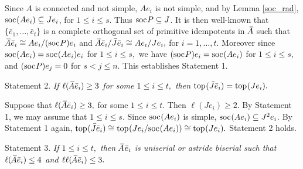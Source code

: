 \documentclass[10pt]{amsart}
\theoremstyle{definition}
\newcommand{\soc}{{\rm soc}\hspace{.5pt}}
\newcommand{\ntop}{{\rm top}\hspace{.5pt}}
\begin{document}
Since $A$ is connected and not simple, $Ae_i$ is not simple, and by Lemma \ref{soc_rad}, $\soc(Ae_i)\subseteq Je_i$, for $1\le i\le s$. Thus $\soc P\subseteq J$. It is then well-known that $\{\bar e_1, \ldots, \bar e_t\}$ is a complete orthogonal set of primitive idempotents in $\hspace{2pt}\overline{\hspace{-2.8pt}A}$ such that $\hspace{2pt}\overline{\hspace{-2.5pt}A} \bar e_i \cong Ae_i/(\soc P)e_i$ and $\hspace{2pt}\overline{\hspace{-2.5pt}A} \bar e_i / \bar J \bar e_i \cong Ae_i/Je_i,$ for $i=1, \ldots, t$. Moreover since $\soc(Ae_i) =\soc(Ae_i)e_i$ for $1\le i\le s,$ we have $(\soc P)e_i=\soc(Ae_i)$ for $1\le i\le s,$ and $(\soc P)e_j=0$ for $s<j\le n$. This establishes Statement 1.

\vspace{1pt}

{\sc Statement 2.} {\it If $\ell(\hspace{2pt}\overline{\hspace{-2.5pt}A} \bar e_i)\ge 3$ for some $1\le i\le t,$ then $\ntop(\bar J \bar e_i) =\ntop(Je_i).$}

\vspace{1pt}

Suppose that $\ell(\hspace{2pt}\overline{\hspace{-2.5pt}A} \bar e_i)\ge 3,$ for some $1\le i\le t.$ Then $\ell(Je_i)\ge 2$. By Statement 1, we may assume that $1\le i\le s$. Since $\soc(Ae_i)$ is simple, $\soc(Ae_i)\subseteq J^2e_i$. By Statement 1 again, $\ntop(\bar J \bar e_i)\cong \ntop(Je_i/\soc(Ae_i))\cong \ntop(Je_i).$ Statement 2 holds.

\vspace{1pt}

{\sc Statement 3.} {\it If $1\le i\le t,$ then $\hspace{2pt}\overline{\hspace{-2.8pt}A} \hspace{.5pt}\bar e_i$ is uniserial or astride biserial such that $\ell(\hspace{2pt}\overline{\hspace{-2.8pt}A} \bar e_i)\le 4$ and $\ell\ell(\hspace{2pt}\overline{\hspace{-2.8pt}A} \bar e_i)\le 3.$}  
\end{document}
